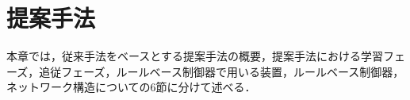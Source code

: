 \chapter{提案手法}

  本章では，従来手法をベースとする提案手法の概要，提案手法における学習フェーズ，追従フェーズ，ルールベース制御器で用いる装置，ルールベース制御器，ネットワーク構造についての6節に分けて述べる．

\label{chap:suggest}
%







%
